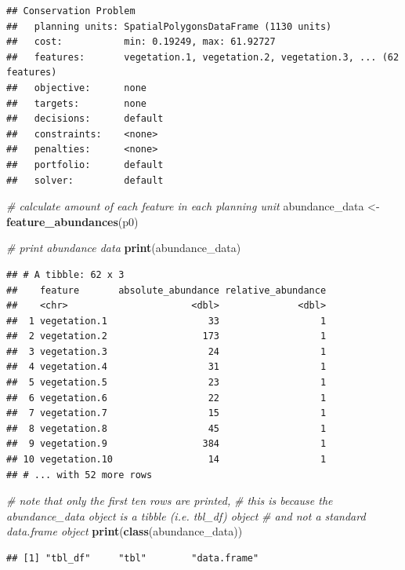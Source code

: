 \documentclass[12pt,]{book}
\newenvironment{Shaded}{\begin{snugshade}}{\end{snugshade}}
\newcommand{\KeywordTok}[1]{\textcolor[rgb]{0.13,0.29,0.53}{\textbf{#1}}}
\newcommand{\StringTok}[1]{\textcolor[rgb]{0.31,0.60,0.02}{#1}}
\newcommand{\CommentTok}[1]{\textcolor[rgb]{0.56,0.35,0.01}{\textit{#1}}}
\newcommand{\NormalTok}[1]{#1}
\begin{document}
\begin{verbatim}
## Conservation Problem
##   planning units: SpatialPolygonsDataFrame (1130 units)
##   cost:           min: 0.19249, max: 61.92727
##   features:       vegetation.1, vegetation.2, vegetation.3, ... (62 features)
##   objective:      none
##   targets:        none
##   decisions:      default
##   constraints:    <none>
##   penalties:      <none>
##   portfolio:      default
##   solver:         default
\end{verbatim}

\begin{Shaded}
\begin{Highlighting}[]
\CommentTok{# calculate amount of each feature in each planning unit}
\NormalTok{abundance_data <-}\StringTok{ }\KeywordTok{feature_abundances}\NormalTok{(p0)}

\CommentTok{# print abundance data}
\KeywordTok{print}\NormalTok{(abundance_data)}
\end{Highlighting}
\end{Shaded}

\begin{verbatim}
## # A tibble: 62 x 3
##    feature       absolute_abundance relative_abundance
##    <chr>                      <dbl>              <dbl>
##  1 vegetation.1                  33                  1
##  2 vegetation.2                 173                  1
##  3 vegetation.3                  24                  1
##  4 vegetation.4                  31                  1
##  5 vegetation.5                  23                  1
##  6 vegetation.6                  22                  1
##  7 vegetation.7                  15                  1
##  8 vegetation.8                  45                  1
##  9 vegetation.9                 384                  1
## 10 vegetation.10                 14                  1
## # ... with 52 more rows
\end{verbatim}

\begin{Shaded}
\begin{Highlighting}[]
\CommentTok{# note that only the first ten rows are printed,}
\CommentTok{# this is because the abundance_data object is a tibble (i.e. tbl_df) object}
\CommentTok{# and not a standard data.frame object}
\KeywordTok{print}\NormalTok{(}\KeywordTok{class}\NormalTok{(abundance_data))}
\end{Highlighting}
\end{Shaded}

\begin{verbatim}
## [1] "tbl_df"     "tbl"        "data.frame"
\end{verbatim}
\end{document}
